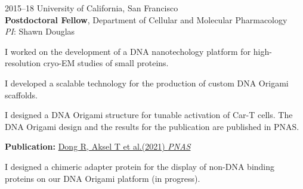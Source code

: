 \documentclass[12pt,letterpaper]{report}
\newcommand{\listitemspace}{0.25em}
\renewenvironment{itemize}
{\begin{list}{}{\setlength{\leftmargin}{0em}
                \setlength{\parskip}{0em}
                \setlength{\itemsep}{\listitemspace}
                \setlength{\parsep}{\listitemspace}}}
{\end{list}}
\begin{document}
\begin{tablist}
        \item[2015--18]\tab{}University of California, San Francisco \\
                             \textbf{Postdoctoral Fellow}, Department of Cellular and Molecular Pharmacology \\
                             \textit{PI}: Shawn Douglas
                             \begin{itemize}
                                \item \textbullet \hspace{0.2cm} I worked on the development of a DNA nanotechology platform for high-resolution cryo-EM studies of small proteins.
                                \item \textbullet \hspace{0.2cm} I developed a scalable technology for the production of custom DNA Origami scaffolds.
                                \item \textbullet \hspace{0.2cm} I designed a DNA Origami structure for tunable activation of Car-T cells. The DNA Origami design and the results for the publication are published in PNAS.
                                \begin{itemize}
                                    \item \hspace{1cm} \textbf{Publication:} \href{https://doi.org/10.1073/pnas.2109057118}{Dong R, Aksel T et al.(2021) \textit{PNAS}}
                                \end{itemize}
                                \item \textbullet \hspace{0.2cm} I designed a chimeric adapter protein for the display of non-DNA binding proteins on our DNA Origami platform (in progress).
                            \end{itemize}


\end{tablist}
\end{document}
